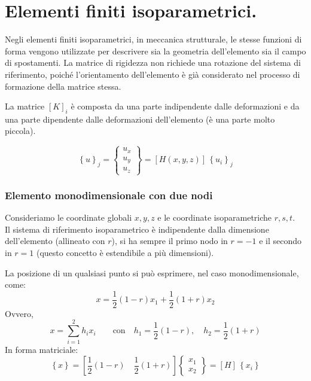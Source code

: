 \section{Elementi finiti isoparametrici.}

\begin{definizioneBox}
    Negli elementi finiti isoparametrici, in meccanica strutturale, le stesse funzioni di forma vengono utilizzate per descrivere sia la geometria dell'elemento sia il campo di spostamenti.
La matrice di rigidezza non richiede una rotazione del sistema di riferimento, poiché l'orientamento dell'elemento è già considerato nel processo di formazione della matrice stessa.
\end{definizioneBox}

La matrice $[K]_i$ è composta da una parte indipendente dalle deformazioni e da una parte dipendente dalle deformazioni dell'elemento (è una parte molto piccola). 

\begin{equation*}
    \left\{u \right\}_j = \begin{Bmatrix}
        u_x\\u_y\\u_z 
    \end{Bmatrix}= [H(x,y,z)] \,\left\{u_i \right\}_j
\end{equation*}

\subsubsection*{Elemento monodimensionale con due nodi}
 Consideriamo le coordinate globali $x,y,z$ e le coordinate isoparametriche $r,s,t$.\\
 Il sistema di riferimento isoparametrico è indipendente dalla dimensione dell'elemento (allineato con $r$), si ha sempre il primo nodo in $r=-1$ e il secondo in $r=1$ (questo concetto è estendibile a più dimensioni).
 
La posizione di un qualsiasi punto si può esprimere, nel caso monodimensionale, come:
\begin{equation*}
    x=\frac{1}{2}(1-r)x_1+\frac{1}{2}(1+r)x_2
\end{equation*}
Ovvero,
\begin{equation*}
    x=\sum^2_{i=1} h_ix_i \qquad \text{con} \quad h_1=\frac{1}{2}(1-r), \quad  h_2=\frac{1}{2}(1+r)
\end{equation*}
In forma matriciale:
\begin{equation*}
    \left\{x \right\} = \left[\frac{1}{2}(1-r) \quad  \frac{1}{2}(1+r)\right]\begin{Bmatrix}
        x_1\\x_2
    \end{Bmatrix}= [H] \,\left\{x_i \right\}
\end{equation*}

